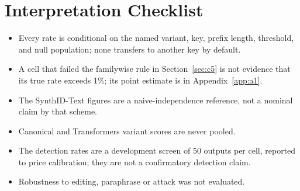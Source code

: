 \documentclass[conference]{IEEEtran}
\begin{document}
\section{Interpretation Checklist}

\begin{itemize}
  \item Every rate is conditional on the named variant, key, prefix length,
  threshold, and null population; none transfers to another key by default.
  \item A cell that failed the familywise rule in Section~\ref{sec:c5} is not
  evidence that its true rate exceeds 1\%; its point estimate is in
  Appendix~\ref{app:a1}.
  \item The SynthID-Text figures are a naive-independence reference, not a
  nominal claim by that scheme.
  \item Canonical and Transformers variant scores are never pooled.
  \item The detection rates are a development screen of 50 outputs per cell,
  reported to price calibration; they are not a confirmatory detection claim.
  \item Robustness to editing, paraphrase or attack was not evaluated.
\end{itemize}
\end{document}
